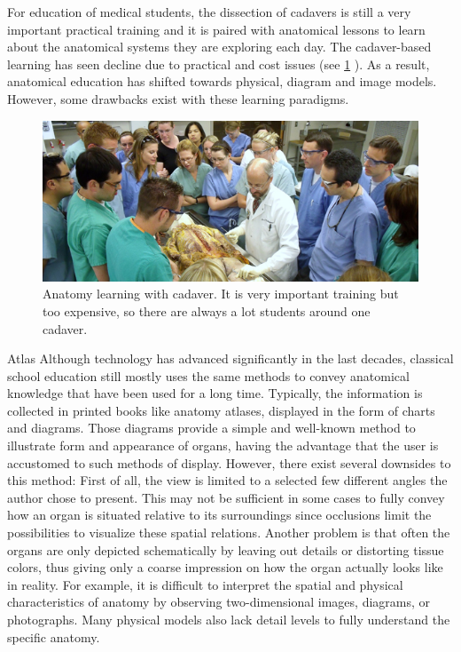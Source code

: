 For education of medical students, the dissection of cadavers is still a very important practical training and it is paired with anatomical lessons to learn about the anatomical systems they are exploring each day. The cadaver-based learning has seen decline due to practical and cost issues (see \figurename{ \ref{fig:2-bg:cadaver} }). As a result, anatomical education has shifted towards physical, diagram and image models. However, some drawbacks exist with these learning paradigms.
\begin{figure}
\centering
\includegraphics[width=0.7\linewidth]{figures/2-bg/cadaver}
\caption{Anatomy learning with cadaver. It is very important training but too expensive, so there are always a lot students around one cadaver.}
\label{fig:2-bg:cadaver}
\end{figure}

Atlas Although technology has advanced significantly in the last decades, classical school education still mostly uses the same methods to convey anatomical knowledge that have been used for a long time\CN. Typically, the information is collected in printed books like anatomy atlases, displayed in the form of charts and diagrams. Those diagrams provide a simple and well-known method to illustrate form and appearance of organs, having the advantage that the user is accustomed to such methods of display. However, there exist several downsides to this method: First of all, the view is limited to a selected few different angles the author chose to present. This may not be sufficient in some cases to fully convey how an organ is situated relative to its surroundings since occlusions limit the possibilities to visualize these spatial relations\CN. Another problem is that often the organs are only depicted schematically by leaving out details or distorting tissue colors, thus giving only a coarse impression on how the organ actually looks like in reality.
For example, it is difficult to interpret the spatial and physical characteristics of anatomy by observing two-dimensional images, diagrams, or photographs. Many physical models also lack detail levels to fully understand the specific anatomy.


